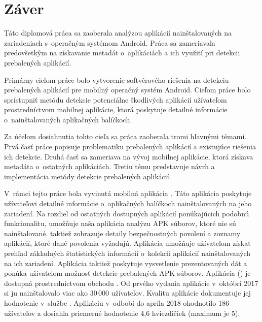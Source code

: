 \chapter*{Záver}
Táto diplomová práca sa zaoberala analýzou aplikácií nainštalovaných na zariadeniach s~operačným systémom Android. Práca sa zameriavala predovšetkým na získavanie metadát o~aplikáciách a ich využití pri detekcii prebalených aplikácií.

Primárny cieľom práce bolo vytvorenie softvérového riešenia na detekciu prebalených aplikácií pre mobilný operačný systém Android. Cieľom práce bolo sprístupniť metódu detekcie potenciálne škodlivých aplikácií užívateľom prostredníctvom mobilnej aplikácie, ktorá poskytuje detailné informácie o~nainštalovaných aplikačných balíčkoch.  

Za účelom dosiahnutia tohto cieľa sa práca zaoberala tromi hlavnými témami. Prvá časť práce popisuje problematiku prebalených aplikácií a existujúce riešenia ich detekcie. Druhá časť sa zameriava na vývoj mobilnej aplikácie, ktorá získava metadáta o~ostatných aplikáciách. Tretiu tému predstavuje návrh a implementácia metódy detekcie prebalených aplikácií. 

V~rámci tejto práce bola vyvinutá mobilná aplikácia . Táto aplikácia poskytuje užívateľovi detailné informácie o~aplikačných balíčkoch nainštalovaných na jeho zariadení. Na rozdiel od ostatných dostupných aplikácií ponúkajúcich podobnú funkcionalitu, umožňuje naša aplikácia analýzu APK súborov, ktoré nie sú nainštalované.  taktiež zobrazuje detaily bezpečnostných povolení a zoznamy aplikácií, ktoré dané povolenia vyžadujú. Aplikácia umožňuje užívateľom získať prehľad základných štatistických informácií o~kolekcii aplikácií nainštalovaných na ich zariadení. Aplikácia taktiež poskytuje vysvetlenie prezentovaných dát a ponúka užívateľom možnosť detekcie prebalených APK súborov. Aplikácia  () je dostupná prostredníctvom obchodu . Od prvého vydania aplikácie v~októbri 2017 si ju nainštalovalo viac ako 30\,000 užívateľov. Kvalitu aplikácie dokumentuje jej hodnotenie v~službe . Aplikáciu v~odbobí do apríla 2018 ohodnotilo 186 užívateľov a dosiahla priemerné hodnotenie 4,6 hviezdičiek (maximum je 5).

